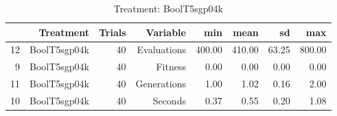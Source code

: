 \begin{table}[ht]
\centering
\begin{tabular}{rrrrrrrr}
  \hline
 & Treatment & Trials & Variable & min & mean & sd & max \\ 
  \hline
12 & BoolT5sgp04k &  40 & Evaluations & 400.00 & 410.00 & 63.25 & 800.00 \\ 
  9 & BoolT5sgp04k &  40 & Fitness & 0.00 & 0.00 & 0.00 & 0.00 \\ 
  11 & BoolT5sgp04k &  40 & Generations & 1.00 & 1.02 & 0.16 & 2.00 \\ 
  10 & BoolT5sgp04k &  40 & Seconds & 0.37 & 0.55 & 0.20 & 1.08 \\ 
   \hline
\end{tabular}
\caption{Treatment: BoolT5sgp04k} 
\end{table}
